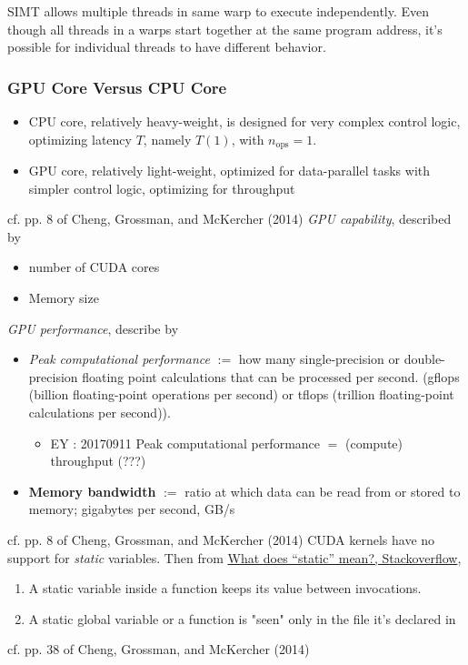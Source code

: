 \documentclass[10pt]{amsart}
\begin{document}
\begin{multicols*}{2}
SIMT allows multiple threads in same warp to execute independently.  Even though all threads in a warps start together at the same program address, it's possible for individual threads to have different behavior.  

\subsubsection{GPU Core Versus CPU Core}  
\begin{itemize}
	\item CPU core, relatively heavy-weight, is designed for very complex control logic, optimizing latency $T$, namely $T(1)$, with $n_{\text{ops}}=1$.  
	\item GPU core, relatively light-weight, optimized for data-parallel tasks with simpler control logic, optimizing for throughput   
\end{itemize}
cf. pp. 8 of Cheng, Grossman, and McKercher (2014) \cite{CGM2014}
\emph{GPU capability}, described by 
\begin{itemize}
	\item number of CUDA cores  
	\item Memory size
\end{itemize}
\emph{GPU performance}, describe by 
\begin{itemize}
	\item \emph{Peak computational performance} $:=$ how many single-precision or double-precision floating point calculations that can be processed per second.  (gflops (billion floating-point operations per second) or tflops (trillion floating-point calculations per second)).  
	\begin{itemize}
		\item EY : 20170911 Peak computational performance $=$ (compute) throughput (???)
	\end{itemize}
	\item \textbf{Memory bandwidth} $:=$ ratio at which data can be read from or stored to memory; gigabytes per second, GB/s
\end{itemize}
cf. pp. 8 of Cheng, Grossman, and McKercher (2014) \cite{CGM2014}
CUDA kernels have no support for \emph{static} variables.  
Then from \href{https://stackoverflow.com/questions/572547/what-does-static-mean}{What does “static” mean?, Stackoverflow}, 
\begin{enumerate}
	\item A static variable inside a function keeps its value between invocations. 
	\item A static global variable or a function is "seen" only in the file it's declared in
\end{enumerate}
cf. pp. 38 of Cheng, Grossman, and McKercher (2014) \cite{CGM2014}



\end{multicols*}
\end{document}
